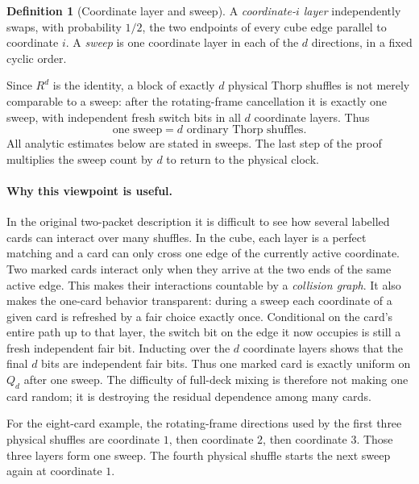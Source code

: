 \documentclass[11pt]{article}
\numberwithin{equation}{section}
\theoremstyle{definition}\newtheorem{definition}[theorem]{Definition}
\theoremstyle{remark}\newtheorem{remark}[theorem]{Remark}
\begin{document}
\begin{definition}[Coordinate layer and sweep]\label{def:sweep}
A \emph{coordinate-$i$ layer} independently swaps, with probability $1/2$,
the two endpoints of every cube edge parallel to coordinate $i$.  A
\emph{sweep} is one coordinate layer in each of the $d$ directions, in a fixed
cyclic order.
\end{definition}

Since $R^d$ is the identity, a block of exactly $d$ physical Thorp shuffles is
not merely comparable to a sweep: after the rotating-frame cancellation it is
exactly one sweep, with independent fresh switch bits in all $d$ coordinate
layers.  Thus
\begin{equation}\label{eq:clock-conversion}
 \boxed{\text{one sweep}=d\text{ ordinary Thorp shuffles}.}
\end{equation}
All analytic estimates below are stated in sweeps.  The last step of the proof
multiplies the sweep count by $d$ to return to the physical clock.

\paragraph{Why this viewpoint is useful.}
In the original two-packet description it is difficult to see how several
labelled cards can interact over many shuffles.  In the cube, each layer is a
perfect matching and a card can only cross one edge of the currently active
coordinate.  Two marked cards interact only when they arrive at the two ends
of the same active edge.  This makes their interactions countable by a
\emph{collision graph}.  It also makes the one-card behavior transparent:
during a sweep each coordinate of a given card is refreshed by a fair choice
exactly once.  Conditional on the card's entire path up to that layer, the
switch bit on the edge it now occupies is still a fresh independent fair bit.
Inducting over the $d$ coordinate layers shows that the final $d$ bits are
independent fair bits.  Thus one marked card is exactly uniform on $Q_d$ after
one sweep.  The difficulty of full-deck mixing is therefore not making one
card random; it is destroying the residual dependence among many cards.

For the eight-card example, the rotating-frame directions used by the first
three physical shuffles are coordinate $1$, then coordinate $2$, then
coordinate $3$.  Those three layers form one sweep.  The fourth physical
shuffle starts the next sweep again at coordinate $1$.
\end{document}
